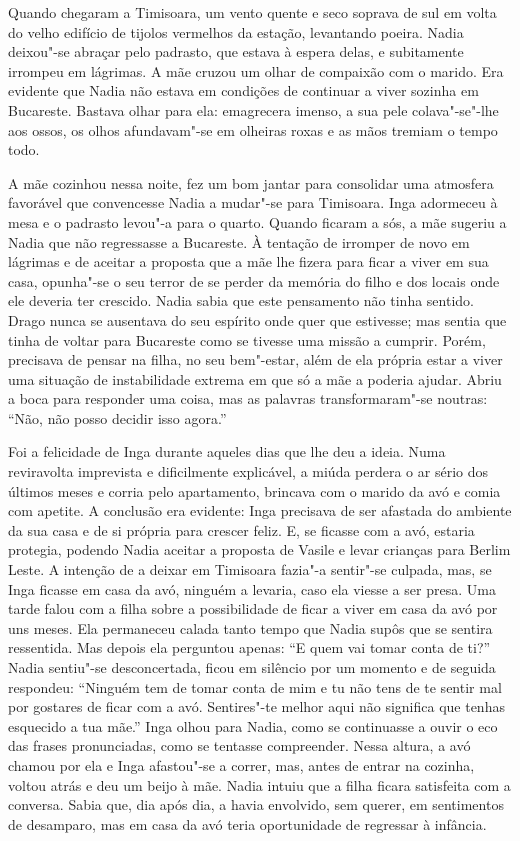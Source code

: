 Quando chegaram a Timisoara, um vento quente e seco soprava de sul em
volta do velho edifício de tijolos vermelhos da estação, levantando
poeira. Nadia deixou"-se abraçar pelo padrasto, que estava à espera
delas, e subitamente irrompeu em lágrimas. A mãe cruzou um olhar de compaixão com o marido. Era evidente que Nadia não estava em condições de
continuar a viver sozinha em Bucareste. Bastava olhar para ela:
emagrecera imenso, a sua pele colava"-se"-lhe aos ossos, os olhos
afundavam"-se em olheiras roxas e as mãos tremiam o tempo todo.

A mãe cozinhou nessa noite, fez um bom jantar para consolidar uma
atmosfera favorável que convencesse Nadia a mudar"-se para Timisoara.
Inga adormeceu à mesa e o padrasto levou"-a para o quarto. Quando ficaram
a sós, a mãe sugeriu a Nadia que não regressasse a Bucareste. À tentação de irromper de novo em lágrimas e de aceitar a proposta que a
mãe lhe fizera para ficar a viver em sua casa, opunha"-se o seu terror de
se perder da memória do filho e dos locais onde ele deveria ter
crescido. Nadia sabia que este pensamento não tinha sentido. Drago nunca
se ausentava do seu espírito onde quer que estivesse; mas sentia que
tinha de voltar para Bucareste como se tivesse uma missão a cumprir.
Porém, precisava de pensar na filha, no seu bem"-estar, além de ela
própria estar a viver uma situação de instabilidade extrema em que só a
mãe a poderia ajudar. Abriu a boca para responder uma coisa, mas as
palavras transformaram"-se noutras: ``Não, não posso decidir isso
agora.''

Foi a felicidade de Inga durante aqueles dias que lhe deu a ideia. Numa
reviravolta imprevista e dificilmente explicável, a miúda perdera o ar
sério dos últimos meses e corria pelo apartamento, brincava com o marido
da avó e comia com apetite. A conclusão era evidente: Inga precisava
de ser afastada do ambiente da sua casa e de si própria para crescer
feliz. E, se ficasse com a avó, estaria protegia, podendo Nadia aceitar
a proposta de Vasile e levar crianças para Berlim Leste. A intenção de a
deixar em Timisoara fazia"-a sentir"-se culpada, mas, se Inga ficasse em
casa da avó, ninguém a levaria, caso ela viesse a ser presa. Uma tarde
falou com a filha sobre a possibilidade de ficar a viver em casa da avó
por uns meses. Ela permaneceu calada tanto tempo que Nadia supôs que se
sentira ressentida. Mas depois ela perguntou apenas: ``E quem vai tomar
conta de ti?'' Nadia sentiu"-se desconcertada, ficou em silêncio por um
momento e de seguida respondeu: ``Ninguém tem de tomar conta de mim e
tu não tens de te sentir mal por gostares de ficar com a avó.
Sentires"-te melhor aqui não significa que tenhas esquecido a tua mãe.''
Inga olhou para Nadia, como se continuasse a ouvir o eco das frases
pronunciadas, como se tentasse compreender. Nessa altura, a avó chamou
por ela e Inga afastou"-se a correr, mas, antes de entrar na cozinha,
voltou atrás e deu um beijo à mãe. Nadia intuiu que a filha ficara
satisfeita com a conversa. Sabia que, dia após dia, a havia envolvido,
sem querer, em sentimentos de desamparo, mas em casa da avó
teria oportunidade de regressar à infância.

